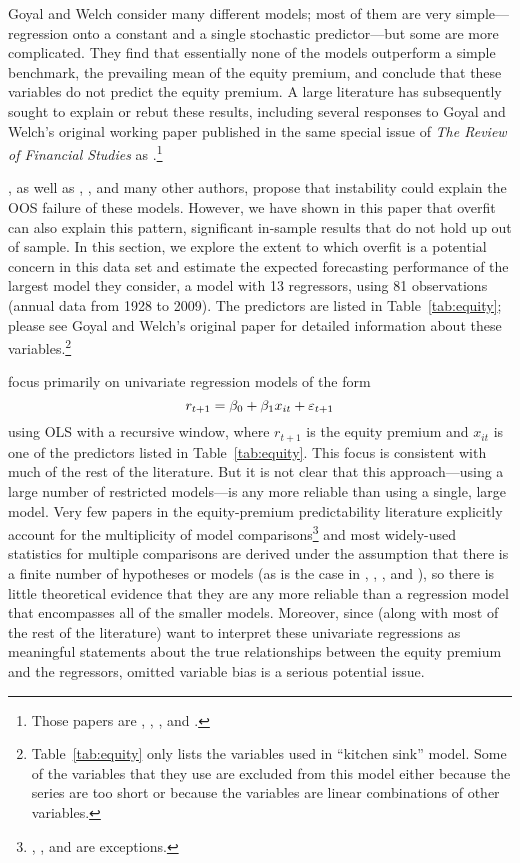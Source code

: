 \documentclass[12pt,draft]{article}
\begin{document}
Goyal and Welch consider many different models; most of them are very
simple---regression onto a constant and a single stochastic
predictor---but some are more complicated. They find that essentially
none of the models outperform a simple benchmark, the prevailing mean
of the equity premium, and conclude that these variables do not
predict the equity premium. A large literature has subsequently sought
to explain or rebut these results, including several responses to
Goyal and Welch's original working paper published in the same special
issue of \textit{The Review of Financial Studies} as
\citet{GoW:08}.\footnote{%
  Those papers are \citet{CaT:08}, \citet{Coc:08}, \citet{BRW:08}, and
  \citet{LeN:08}.} %

\citet{GoW:08}, as well as \citet{BoH:99}, \citet{LeN:08}, and many
other authors, propose that instability could explain the OOS failure
of these models. However, we have shown in this paper that overfit can
also explain this pattern, significant in-sample results that do not
hold up out of sample. In this section, we explore the extent to which
overfit is a potential concern in this data set and estimate the
expected forecasting performance of the largest model they consider, a
model with 13 regressors, using 81 observations (annual data from 1928
to 2009). The predictors are listed in Table~\ref{tab:equity}; please
see Goyal and Welch's original paper for detailed information about
these variables.\footnote{%
  Table~\ref{tab:equity} only lists the variables used in
   ``kitchen sink'' model.  Some of the variables that
  they use are excluded from this model either because the series are
  too short or because the variables are linear combinations of other
  variables.} %

\citet{GoW:08} focus primarily on univariate regression models of the
form
\[
r_{t+1} = \beta_0 + \beta_1 x_{it} + \varepsilon_{t+1}
\]
using OLS with a recursive window, where $r_{t+1}$ is the equity
premium and $x_{it}$ is one of the predictors listed in
Table~\ref{tab:equity}.
This focus is consistent with much of the rest of the literature. But
it is not clear that this approach---using a large number of
restricted models---is any more reliable than using a single, large
model. Very few papers in the equity-premium predictability literature
explicitly account for the multiplicity of model comparisons\footnote{%
  \citet{RaW:06}, \citet{RaZ:12}, and \citet{Cal:15} are
  exceptions.} %
and most widely-used statistics for multiple comparisons are
derived under the assumption that there is a finite number of
hypotheses or models (as is the case in \citealp{STW:99c},
\citealp{Whi:00}, \citealp{Han:05}, and \citealp{LeR:05}), so there is
little theoretical evidence that they are any more reliable than a
regression model that encompasses all of the smaller models. Moreover,
since \citet{GoW:08} (along with most of the rest of the literature)
want to interpret these univariate regressions as meaningful
statements about the true relationships between the equity premium and
the regressors, omitted variable bias is a serious potential issue.
\end{document}
